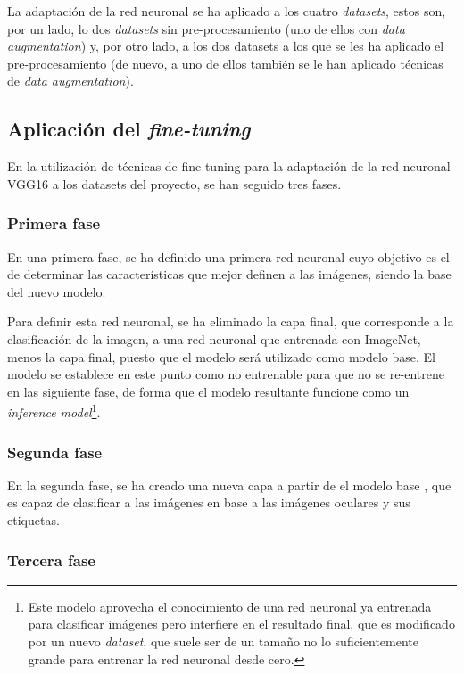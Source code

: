 La adaptación de la red neuronal se ha aplicado a los cuatro \textit{datasets}, estos son, por un lado, lo dos \textit{datasets} sin pre-procesamiento (uno de ellos con \textit{data augmentation}) y, por otro lado, a los dos datasets a los que se les ha aplicado el pre-procesamiento (de nuevo, a uno de ellos también se le han aplicado técnicas de \textit{data augmentation}). 
\subsection{Aplicación del \textit{fine-tuning}}

En la  utilización de técnicas de fine-tuning para la adaptación de la red neuronal VGG16 a los datasets del proyecto, se han seguido tres fases. 

\subsubsection{Primera fase}
En una primera fase, se ha definido una primera red neuronal cuyo objetivo es el de determinar las características que mejor definen a las imágenes, siendo la base del nuevo modelo. 

Para definir esta red neuronal, se ha eliminado la capa final, que corresponde a la clasificación de la imagen, a una red neuronal que entrenada con ImageNet, menos la capa final, puesto que el modelo será utilizado como modelo base. El modelo se establece en este punto como no entrenable para que no se re-entrene en las siguiente fase, de forma que el modelo resultante funcione como un \textit{inference model}\footnote{Este modelo aprovecha el conocimiento de una red neuronal ya entrenada para clasificar imágenes pero interfiere en el resultado final, que es modificado por un nuevo \textit{dataset}, que suele ser de un tamaño no lo suficientemente grande para entrenar la red neuronal desde cero.}. 

\subsubsection{Segunda fase}

En la segunda fase, se ha creado una nueva capa a partir de el modelo base , que es capaz de clasificar a las imágenes en base a las imágenes oculares y sus etiquetas. 

\subsubsection{Tercera fase}

